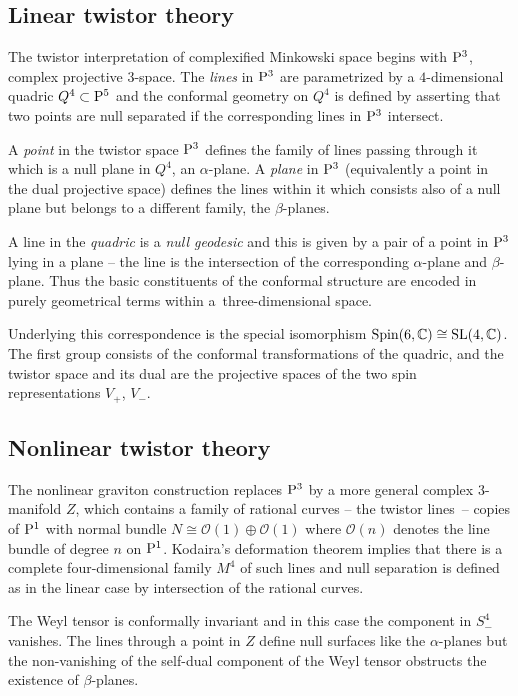 \documentclass[pdftex]{sigma}
\numberwithin{equation}{section}
\begin{document}
\subsection{Linear twistor theory}
The twistor interpretation of complexified Minkowski space begins with ${\rm P}^3$, complex projective $3$-space. The {\it lines} in ${\rm P}^3$ are parametrized by a $4$-dimensional quadric $Q^4\subset{\rm P}^5$ and the conformal geometry on $Q^4$ is defined by asserting that two points are null separated if the corresponding lines in ${\rm P}^3$ intersect.

A {\it point} in the twistor space ${\rm P}^3$ defines the family of lines passing through it which is a null plane in $Q^4$, an $\alpha$-plane. A {\it plane} in ${\rm P}^3$ (equivalently a point in the dual projective space) defines the lines within it which consists also of a null plane but belongs to a different family, the $\beta$-planes.

A line in the {\it quadric} is a {\it null geodesic} and this is given by a pair of a point in ${\rm P}^3$ lying in a plane -- the line is the intersection of the corresponding $\alpha$-plane and $\beta$-plane. Thus the basic constituents of the conformal structure are encoded in purely geometrical terms within a~three-dimensional space.

Underlying this correspondence is the special isomorphism ${\rm Spin}(6,{\mathbb C})\cong {\rm SL}(4,{\mathbb C})$. The first group consists of the conformal transformations of the quadric, and the twistor space and its dual are the projective spaces of the two spin representations $V_+$, $V_-$.

\subsection{Nonlinear twistor theory} \label{graviton}
The nonlinear graviton construction \cite{Penrose} replaces ${\rm P}^3$ by a more general complex $3$-manifold $Z$, which contains a family of rational curves -- the twistor lines~-- copies of ${\rm P}^1$ with normal bundle $N\cong \mathcal{O}(1)\oplus \mathcal{O}(1)$ where $\mathcal{O}(n)$ denotes the line bundle of degree $n$ on ${\rm P}^1$. Kodaira's deformation theorem implies that there is a complete four-dimensional family $M^4$ of such lines and null separation is defined as in the linear case by intersection of the rational curves.

The Weyl tensor is conformally invariant and in this case the component in $S^4_-$ vanishes. The lines through a point in $Z$ define null surfaces like the $\alpha$-planes but the non-vanishing of the self-dual component of the Weyl tensor obstructs the existence of $\beta$-planes.
\end{document}
